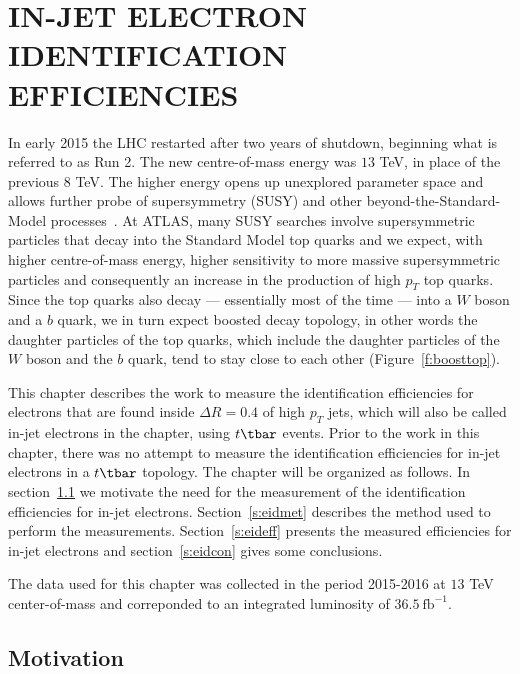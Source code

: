 \chapter{IN-JET ELECTRON IDENTIFICATION EFFICIENCIES}\label{c:eid}

In early 2015 the LHC restarted after two years of shutdown, beginning what is
referred to as Run 2. The new centre-of-mass energy was $13$ TeV, in place of
the previous $8$ TeV. The higher energy opens up unexplored parameter space and
allows further probe of supersymmetry (SUSY) and other
beyond-the-Standard-Model processes~\cite{multib-c7, stop-c7, ttresonance-c7,
	vlq-c7}. At ATLAS, many SUSY searches involve supersymmetric particles that
decay into the Standard Model top quarks and we expect, with higher
centre-of-mass energy, higher sensitivity to more massive supersymmetric
particles and consequently an increase in the production of high $p_T$ top
quarks. Since the top quarks also decay --- essentially most of the time ---
into a $W$ boson and a $b$ quark, we in turn expect boosted decay topology, in
other words the daughter particles of the top quarks, which include the
daughter particles of the $W$ boson and the $b$ quark, tend to stay close to
each other (Figure~\ref{f:boosttop}).


This chapter describes the work to measure the identification efficiencies for
electrons that are found inside $\Delta R = 0.4$ of high $p_T$ jets, which will
also be called in-jet electrons in the chapter, using $t\tbar$ events. Prior to
the work in this chapter, there was no attempt to measure the identification
efficiencies for in-jet electrons in a $t\tbar$ topology. The chapter will be
organized as follows. In section~\ref{s:eidmot} we motivate the need for the
measurement of the identification efficiencies for in-jet electrons.
Section~\ref{s:eidmet} describes the method used to perform the measurements.
Section~\ref{s:eideff} presents the measured efficiencies for in-jet electrons
and section~\ref{s:eidcon} gives some conclusions.

The data used for this chapter was collected in the period 2015-2016 at $13$
TeV center-of-mass and correponded to an integrated luminosity of
$36.5~\text{fb}^{-1}$.

\section{Motivation}\label{s:eidmot}

